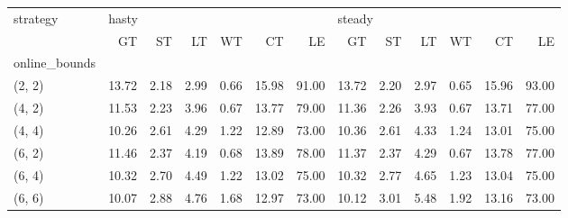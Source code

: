 \begin{tabular}{lrrrrrrrrrrrr}
\toprule
strategy & \multicolumn{6}{l}{hasty} & \multicolumn{6}{l}{steady} \\
{} &    GT &   ST &   LT &   WT &    CT &    LE &     GT &   ST &   LT &   WT &    CT &    LE \\
online\_bounds &       &      &      &      &       &       &        &      &      &      &       &       \\
\midrule
(2, 2)        & 13.72 & 2.18 & 2.99 & 0.66 & 15.98 & 91.00 &  13.72 & 2.20 & 2.97 & 0.65 & 15.96 & 93.00 \\
(4, 2)        & 11.53 & 2.23 & 3.96 & 0.67 & 13.77 & 79.00 &  11.36 & 2.26 & 3.93 & 0.67 & 13.71 & 77.00 \\
(4, 4)        & 10.26 & 2.61 & 4.29 & 1.22 & 12.89 & 73.00 &  10.36 & 2.61 & 4.33 & 1.24 & 13.01 & 75.00 \\
(6, 2)        & 11.46 & 2.37 & 4.19 & 0.68 & 13.89 & 78.00 &  11.37 & 2.37 & 4.29 & 0.67 & 13.78 & 77.00 \\
(6, 4)        & 10.32 & 2.70 & 4.49 & 1.22 & 13.02 & 75.00 &  10.32 & 2.77 & 4.65 & 1.23 & 13.04 & 75.00 \\
(6, 6)        & 10.07 & 2.88 & 4.76 & 1.68 & 12.97 & 73.00 &  10.12 & 3.01 & 5.48 & 1.92 & 13.16 & 73.00 \\
\bottomrule
\end{tabular}
